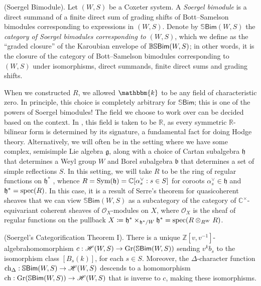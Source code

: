 \noindent\begin{definition}\textup{(Soergel Bimodule).} Let $(W, S)$ be a Coxeter system. A {\em Soergel bimodule} is a direct summand of a finite direct sum of grading shifts of Bott--Samelson bimodules corresponding to expressions in $(W, S)$. Denote by $\mathbb{S}\textsf{Bim}(W, S)$ the {\em category of Soergel bimodules corresponding to $(W, S)$}, which we define as the ``graded closure'' of the Karoubian envelope of $\mathbb{BS}\textup{\textsf{Bim}}(W, S)$; in other words, it is the closure of the category of Bott--Samelson bimodules corresponding to $(W, S)$ under isomorphisms, direct summands, finite direct sums and grading shifts.\\
\end{definition}

\noindent\begin{remark} When we constructed $R$, we allowed $\mathbbm{k}$ to be any field of characteristic zero. In principle, this choice is completely arbitrary for $\mathbb{S}\textsf{Bim}$; this is one of the powers of Soergel bimodules! The field we choose to work over can be decided based on the context. In \cite{EMTW20}, this field is taken to be $\mathbb{R}$, as every symmetric $\mathbb{R}$-bilinear form is determined by its signature, a fundamental fact for doing Hodge theory. Alternatively, we will often be in the setting where we have some complex, semisimple Lie algebra $\mathfrak{g}$, along with a choice of Cartan subalgebra $\mathfrak{h}$ that determines a Weyl group $W$ and Borel subalgebra $\mathfrak{b}$ that determines a set of simple reflections $S$. In this setting, we will take $R$ to be the ring of regular functions on $\mathfrak{h}^*$%
, whence $R = \textup{Sym}(\mathfrak{h}) = \mathbb{C}[\alpha_s^\vee : s \in S]$ for coroots $\alpha_s^\vee \in \mathfrak{h}$ and $\mathfrak{h}^* = \textup{spec}(R)$. In this case, it is a result of Serre's theorem for quasicoherent sheaves that we can view $\mathbb{S}\textsf{Bim}(W, S)$ as a subcategory of the category of $\mathbb{C}^\times$-equivariant coherent sheaves of $\mathscr{O}_X$-modules on $X$, where $\mathscr{O}_X$ is the sheaf of regular functions on the pullback ${X \coloneqq \mathfrak{h}^* \times_{\mathfrak{h}^*/W} \mathfrak{h}^* = \textup{spec}(R \otimes_{R^W} R)}$.\\
\end{remark}

\noindent\begin{theorem}\textup{(Soergel's Categorification Theorem I).}\label{SoergelCategorification} There is a unique $\mathbb{Z}[v, v^{-1}]$-algebra\linebreak homomorphism $c : \mathscr{H}(W, S) \to \textup{Gr}(\mathbb{S}\textup{\textsf{Bim}}(W, S))$ sending $v^k b_s$ to the isomorphism class $[B_s(k)]$, for each $s \in S$. Moreover, the $\Delta$-character function $\textup{ch}_\Delta : \mathbb{S}\textup{\textsf{Bim}}(W, S) \to \mathscr{H}(W, S)$ descends to a homomorphism $\textup{ch} : \textup{Gr}(\mathbb{S}\textup{\textsf{Bim}}(W, S)) \to \mathscr{H}(W, S)$ that is inverse to $c$, making these isomorphisms.\\
\end{theorem}

